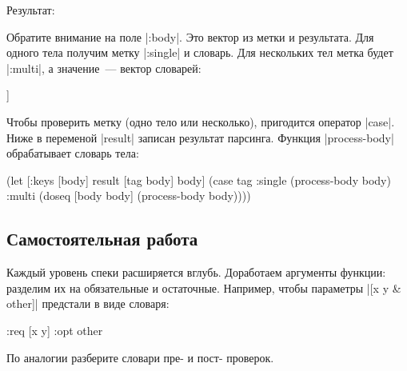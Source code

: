 \noindent
Результат:

\begin{english}
\end{english}

Обратите внимание на поле \spverb|:body|. Это вектор из метки и результата. Для
одного тела получим метку \spverb|:single| и словарь. Для нескольких тел метка
будет \spverb|:multi|, а значение~--- вектор словарей:

\begin{english}
  \begin{clojure}
[:multi [{:args [x] :code [(println 1)]}
         {:args [x y] :code [(println 2)]}]]
  \end{clojure}
\end{english}

Чтобы проверить метку (одно тело или несколько), пригодится оператор
\spverb|case|. Ниже в переменой \spverb|result| записан результат
парсинга. Функция \spverb|process-body| обрабатывает словарь тела:

\begin{english}
  \begin{clojure}
(let [{:keys [body]} result
      [tag body] body]
  (case tag
    :single
    (process-body body)
    :multi
    (doseq [body body]
      (process-body body))))
  \end{clojure}
\end{english}

\subsection{Самостоятельная работа}


Каждый уровень спеки расширяется вглубь. Доработаем аргументы функции: разделим
их на обязательные и остаточные. Например, чтобы параметры \spverb|[x y & other]|
предстали в виде словаря:

\begin{english}
  \begin{clojure}
{:req [x y] :opt other}
  \end{clojure}
\end{english}

\noindent
По аналогии разберите словари пре- и пост- проверок.

